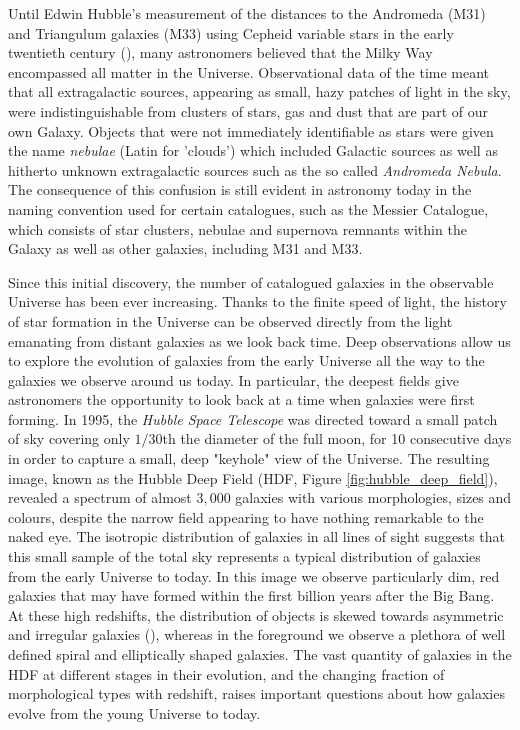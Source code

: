 \sloppy

Until Edwin Hubble's measurement of the distances to the Andromeda (M31) and Triangulum galaxies (M33) using Cepheid variable stars in the early twentieth century (\citealt{Hubble_1925}), many astronomers believed that the Milky Way encompassed all matter in the Universe. Observational data of the time meant that all extragalactic sources, appearing as small, hazy patches of light in the sky, were indistinguishable from clusters of stars, gas and dust that are part of our own Galaxy. Objects that were not immediately identifiable as stars were given the name \textit{nebulae} (Latin for 'clouds') which included Galactic sources as well as hitherto unknown extragalactic sources such as the so called \textit{Andromeda Nebula}. The consequence of this confusion is still evident in astronomy today in the naming convention used for certain catalogues, such as the Messier Catalogue, which consists of star clusters, nebulae and supernova remnants within the Galaxy as well as other galaxies, including M31 and M33.

Since this initial discovery, the number of catalogued galaxies in the observable Universe has been ever increasing. Thanks to the finite speed of light, the history of star formation in the Universe can be observed directly from the light emanating from distant galaxies as we look back time. Deep observations allow us to explore the evolution of galaxies from the early Universe all the way to the galaxies we observe around us today. In particular, the deepest fields give astronomers the opportunity to look back at a time when galaxies were first forming. In 1995, the \textit{Hubble Space Telescope} was directed toward a small patch of sky covering only $1/30$th the diameter of the full moon, for 10 consecutive days in order to capture a small, deep "keyhole" view of the Universe. The resulting image, known as the Hubble Deep Field (HDF, Figure \ref{fig:hubble_deep_field}), revealed a spectrum of almost $3,000$ galaxies with various morphologies, sizes and colours, despite the narrow field appearing to have nothing remarkable to the naked eye. The isotropic distribution of galaxies in all lines of sight suggests that this small sample of the total sky represents a typical distribution of galaxies from the early Universe to today. In this image we observe particularly dim, red galaxies that may have formed within the first billion years after the Big Bang. At these high redshifts, the distribution of objects is skewed towards asymmetric and irregular galaxies (\citealt{Abraham_1996}), whereas in the foreground we observe a plethora of well defined spiral and elliptically shaped galaxies. The vast quantity of galaxies in the HDF at different stages in their evolution, and the changing fraction of morphological types with redshift, raises important questions about how galaxies evolve from the young Universe to today.

